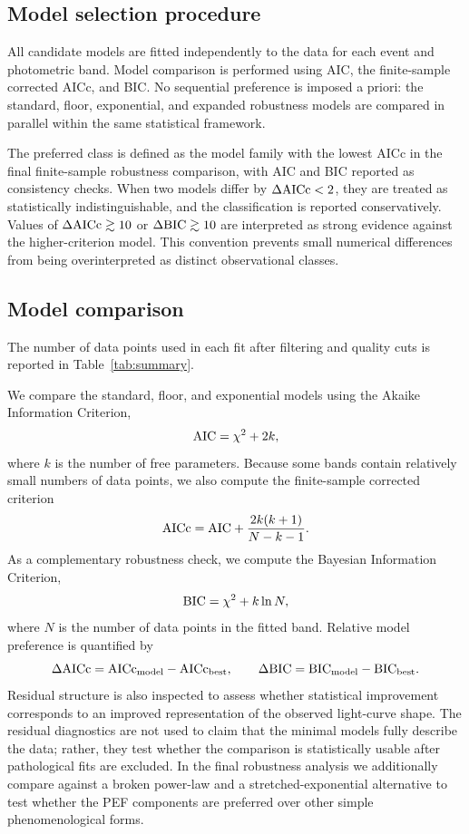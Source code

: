 \documentclass[11pt]{article}
\begin{document}
\subsection{Model selection procedure}
All candidate models are fitted independently to the data for each event and photometric band. Model comparison is performed using AIC, the finite-sample corrected AICc, and BIC. No sequential preference is imposed a priori: the standard, floor, exponential, and expanded robustness models are compared in parallel within the same statistical framework.

The preferred class is defined as the model family with the lowest AICc in the final finite-sample robustness comparison, with AIC and BIC reported as consistency checks. When two models differ by $\Delta {\rm AICc}<2$, they are treated as statistically indistinguishable, and the classification is reported conservatively. Values of $\Delta {\rm AICc}\gtrsim10$ or $\Delta {\rm BIC}\gtrsim10$ are interpreted as strong evidence against the higher-criterion model. This convention prevents small numerical differences from being overinterpreted as distinct observational classes.

\subsection{Model comparison}
The number of data points used in each fit after filtering and quality cuts is reported in Table~\ref{tab:summary}.

We compare the standard, floor, and exponential models using the Akaike Information Criterion,
\begin{equation}
{\rm AIC}=\chi^2+2k,
\end{equation}
where $k$ is the number of free parameters. Because some bands contain relatively small numbers of data points, we also compute the finite-sample corrected criterion
\begin{equation}
{\rm AICc}={\rm AIC}+\frac{2k(k+1)}{N-k-1}.
\end{equation}
As a complementary robustness check, we compute the Bayesian Information Criterion,
\begin{equation}
{\rm BIC}=\chi^2+k\ln N,
\end{equation}
where $N$ is the number of data points in the fitted band. Relative model preference is quantified by
\begin{equation}
\Delta {\rm AICc}={\rm AICc}_{\rm model}-{\rm AICc}_{\rm best}, \qquad
\Delta {\rm BIC}={\rm BIC}_{\rm model}-{\rm BIC}_{\rm best}.
\end{equation}
Residual structure is also inspected to assess whether statistical improvement corresponds to an improved representation of the observed light-curve shape. The residual diagnostics are not used to claim that the minimal models fully describe the data; rather, they test whether the comparison is statistically usable after pathological fits are excluded. In the final robustness analysis we additionally compare against a broken power-law and a stretched-exponential alternative to test whether the PEF components are preferred over other simple phenomenological forms.
\end{document}
